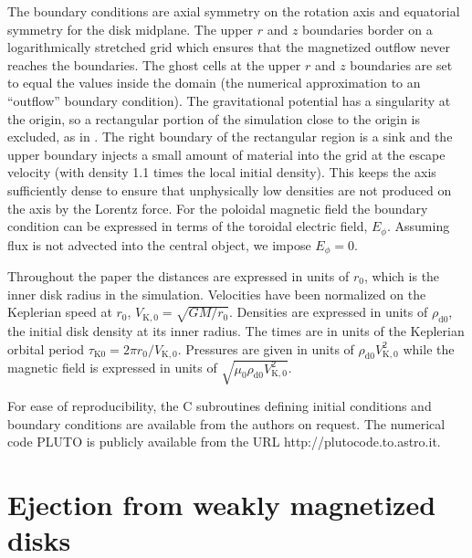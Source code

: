 \documentclass{aa}
\begin{document}
The boundary conditions are axial symmetry on the rotation axis and equatorial symmetry for the disk midplane. The upper $r$ and $z$ boundaries border on a logarithmically stretched grid which ensures
that the magnetized outflow never reaches the boundaries.  The ghost cells at the upper $r$ and $z$ boundaries are set to equal the values inside the domain (the numerical approximation to an
``outflow'' boundary condition).  The gravitational potential has a singularity at the origin, so a rectangular portion of the simulation close to the origin is excluded, as in
\citet{2002ApJ...581..988C}.  The right boundary of the rectangular region is a sink and the upper boundary injects a small amount of material into the grid at the escape velocity (with density 1.1
times the local initial density). This keeps the axis sufficiently dense to ensure that unphysically low densities are not produced on the axis by the Lorentz force. For the poloidal magnetic field
the boundary condition can be expressed in terms of the toroidal electric field, $E_\phi$. Assuming flux is not advected into the central object, we impose $E_\phi=0$.

Throughout the paper the distances are expressed in units of $r_0$, which is the inner disk radius in the simulation. Velocities have been normalized on the Keplerian speed at $r_0$,
$V_\mathrm{K,0}=\sqrt{GM/r_0}$. Densities are expressed in units of $\rho_\mathrm{d0}$, the initial disk density at its inner radius. The times are in units of the Keplerian orbital period $\tau_\mathrm{K0}= 2\pi
r_0/V_\mathrm{K,0}$.  Pressures are given in units of $\rho_\mathrm{d0}V_\mathrm{K,0}^2$ while the magnetic field is expressed in units of $\sqrt{\mu_0 \rho_\mathrm{d0}V_\mathrm{K,0}^2}$.

 For ease of reproducibility, the C subroutines defining initial conditions and boundary conditions are available from the authors on request. The numerical code PLUTO is publicly available from
the URL http://plutocode.to.astro.it.



\section{Ejection from weakly magnetized disks}
\label{Ejection}
\end{document}
